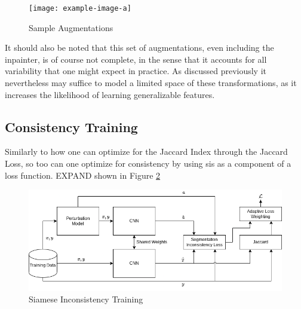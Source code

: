 \begin{figure}
    \centering
    \texttt{[image: example-image-a]}
    \caption{Sample Augmentations}
    \label{fig:my_label}
\end{figure}

It should also be noted that this set of augmentations, even including the inpainter, is of course not complete, in the sense that it accounts for all variability that one might expect in practice. As discussed previously it nevertheless may suffice to model a limited space of these transformations, as it increases the likelihood of learning generalizable features. 


\subsection{Consistency Training}

    Similarly to how one can optimize for the Jaccard Index through the Jaccard Loss, so too can one optimize for consistency by using \gls{sis} as a component of a loss function. EXPAND shown in Figure \ref{fig:consistency_training}
    
    \begin{figure}[ht]
            \centering
            \includegraphics[width=\linewidth]{illustrations/consistency_training.png}
            \caption{Siamese Inconsistency Training}
            \label{fig:consistency_training}
    \end{figure}
    
